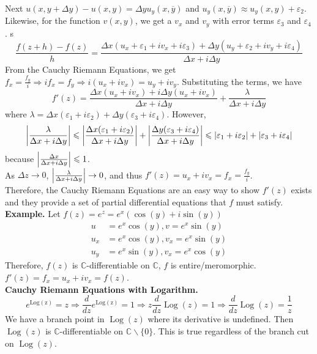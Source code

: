 \documentclass[11pt]{article}
\DeclarePairedDelimiter\abs{\lvert}{\rvert}
\begin{document}
Next $u(x, y + \Delta y) - u(x, y) = \Delta y u_y(x, \overline y)$ and $u_y(x, \overline y) \approx u_y(x, y) + \varepsilon_2$. \\
Likewise, for the function $v(x, y)$, we get a $v_x$ and $v_y$ with error terms $\varepsilon_3$ and $\varepsilon_4$. s
$$\frac{f(z + h) - f(z)}{h} = \frac{\Delta x(u_x + \varepsilon_1 + iv_x + i\varepsilon_3) + \Delta y(u_y + \varepsilon_2 + iv_y + i\varepsilon_4)}{\Delta x + i \Delta y}$$
From the Cauchy Riemann Equations, we get $f_x = \frac{f_y}{i} \Rightarrow if_x = f_y \Rightarrow i(u_x + iv_x) = u_y + iv_y$. Substituting the terms, we have 
$$f'(z) = \frac{\Delta x(u_x + iv_x) + i \Delta y(u_x + iv_x)}{\Delta x + i \Delta y} + \frac{\lambda}{\Delta x + i\Delta y}$$
where $\lambda = \Delta x(\varepsilon_1 + i\varepsilon_2) + \Delta y(\varepsilon_3 + i\varepsilon_4)$. However, \\
$$\abs*{\frac{\lambda}{\Delta x+ i \Delta y}} \leqslant \abs*{\frac{\Delta x(\varepsilon_1 + i\varepsilon_2)}{\Delta x + i\Delta y}} + \abs*{\frac{\Delta y(\varepsilon_3 + i\varepsilon_4)}{\Delta x + i \Delta y}} \leqslant |\varepsilon_1 + i\varepsilon_2| + |\varepsilon_3 + i\varepsilon_4|$$ 
because $\abs*{\frac{\Delta x}{\Delta x + i\Delta y}} \leqslant 1$. \\
As $\Delta z \to 0$, $\abs*{\frac{\lambda}{\Delta x+ i \Delta y}} \to 0$, and thus $f'(z) = u_x + iv_x = f_x = \frac{f_y}{i}$. \\
Therefore, the Cauchy Riemann Equations are an easy way to show $f'(z)$ exists and they provide a set of partial differential equations that $f$ must satisfy. \\
\newline
\textbf{Example.} Let $f(z) = e^z = e^x(\cos(y) + i\sin(y))$ 
\begin{align*}
u &= e^x\cos(y), v = e^x\sin(y) \\ 
u_x &= e^x\cos(y), v_x = e^x\sin(y) \\
u_y &= e^x\sin(y), v_x = e^x\cos(y)
\end{align*}
Therefore, $f(z)$ is $\mathbb{C}$-differentiable on $\mathbb{C}$, $f$ is entire/meromorphic. $f'(z) = f_x = u_x + iv_x = f(z)$. \\
\newline
\textbf{Cauchy Riemann Equations with Logarithm.}
$$e^{\operatorname{Log(z)}} = z \Rightarrow \frac{d}{dz}e^{\operatorname{Log(z)}} = 1 \Rightarrow z\frac{d}{dz}\operatorname{Log}(z) = 1 \Rightarrow \frac{d}{dz}\operatorname{Log}(z) = \frac{1}{z}$$
We have a branch point in $\operatorname{Log}(z)$ where its derivative is undefined. Then $\operatorname{Log}(z)$ is $\mathbb{C}$-differentiable on $\mathbb{C} \backslash \{0\}$. This is true regardless of the branch cut on $\operatorname{Log}(z)$. 
\newpage
\end{document}
